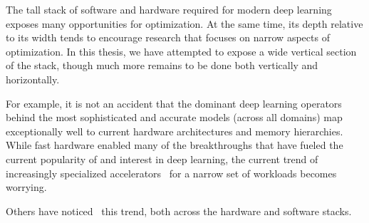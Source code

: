 The tall stack of software and hardware required for modern deep learning exposes many opportunities for optimization.
At the same time, its depth relative to its width tends to encourage research that focuses on narrow aspects of optimization.
In this thesis, we have attempted to expose a wide vertical section of the stack, though much more remains to be done both vertically and horizontally.

For example, it is not an accident that the dominant deep learning operators behind the most sophisticated and accurate models (across all domains) map exceptionally well to current hardware architectures and memory hierarchies.
While fast hardware enabled many of the breakthroughs that have fueled the current popularity of and interest in deep learning, the current trend of increasingly specialized accelerators~\cite{chen2014diannao, chen2016diannao, jouppi2017datacenter, abts2020think} for a narrow set of workloads becomes worrying.


Others have noticed~\cite{barham2019machine} this trend, both across the hardware and software stacks.



